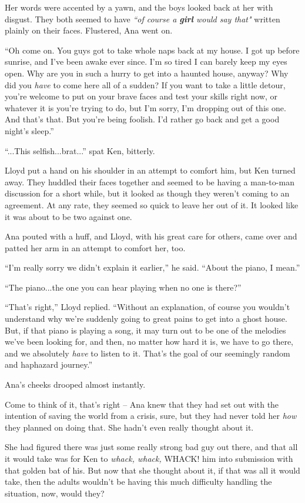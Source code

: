 \documentclass[
]{article}
\begin{document}
Her words were accented by a yawn, and the boys looked back at her with
disgust. They both seemed to have \emph{``of course a \textbf{girl}
would say that"} written plainly on their faces. Flustered, Ana went on.

``Oh come on. You guys got to take whole naps back at my house. I got up
before sunrise, and I've been awake ever since. I'm so tired I can
barely keep my eyes open. Why are you in such a hurry to get into a
haunted house, anyway? Why did you \emph{have} to come here all of a
sudden? If you want to take a little detour, you're welcome to put on
your brave faces and test your skills right now, or whatever it is
you're trying to do, but I'm sorry, I'm dropping out of this one. And
that's that. But you're being foolish. I'd rather go back and get a good
night's sleep.''

``...This selfish...brat...'' spat Ken, bitterly.

Lloyd put a hand on his shoulder in an attempt to comfort him, but Ken
turned away. They huddled their faces together and seemed to be having a
man-to-man discussion for a short while, but it looked as though they
weren't coming to an agreement. At any rate, they seemed so quick to
leave her out of it. It looked like it was about to be two against one.

Ana pouted with a huff, and Lloyd, with his great care for others, came
over and patted her arm in an attempt to comfort her, too.

``I'm really sorry we didn't explain it earlier,'' he said. ``About the
piano, I mean.''

``The piano...the one you can hear playing when no one is there?''

``That's right,'' Lloyd replied. ``Without an explanation, of course you
wouldn't understand why we're suddenly going to great pains to get into
a ghost house. But, if that piano is playing a song, it may turn out to
be one of the melodies we've been looking for, and then, no matter how
hard it is, we have to go there, and we absolutely \emph{have} to listen
to it. That's the goal of our seemingly random and haphazard journey.''

Ana's cheeks drooped almost instantly.

Come to think of it, that's right -- Ana knew that they had set out with
the intention of saving the world from a crisis, sure, but they had
never told her \emph{how} they planned on doing that. She hadn't even
really thought about it.

She had figured there was just some really strong bad guy out there, and
that all it would take was for Ken to \emph{whack, whack, }WHACK! him
into submission with that golden bat of his. But now that she thought
about it, if that was all it would take, then the adults wouldn't be
having this much difficulty handling the situation, now, would they?
\end{document}
